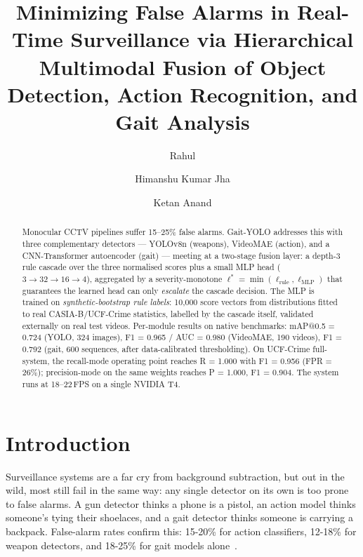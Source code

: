 \documentclass[runningheads]{llncs}
\begin{document}
\title{Minimizing False Alarms in Real-Time Surveillance via Hierarchical Multimodal Fusion of Object Detection, Action Recognition, and Gait Analysis}


\author{
Rahul \and
Himanshu Kumar Jha \and
Ketan Anand 
}



\maketitle

\begin{abstract}
Monocular CCTV pipelines suffer 15--25\% false alarms. Gait-YOLO addresses this with three complementary detectors --- YOLOv8n (weapons), VideoMAE (action), and a CNN-Transformer autoencoder (gait) --- meeting at a two-stage fusion layer: a depth-3 rule cascade over the three normalised scores plus a small MLP head ($3{\to}32{\to}16{\to}4$), aggregated by a severity-monotone $\ell^*=\min(\ell_\text{rule},\ell_\text{MLP})$ that guarantees the learned head can only \emph{escalate} the cascade decision. The MLP is trained on \emph{synthetic-bootstrap rule labels}: 10{,}000 score vectors from distributions fitted to real CASIA-B/UCF-Crime statistics, labelled by the cascade itself, validated externally on real test videos. Per-module results on native benchmarks: mAP@0.5 = 0.724 (YOLO, 324 images), F1 = 0.965 / AUC = 0.980 (VideoMAE, 190 videos), F1 = 0.792 (gait, 600 sequences, after data-calibrated thresholding). On UCF-Crime full-system, the recall-mode operating point reaches R = 1.000 with F1 = 0.956 (FPR = 26\%); precision-mode on the same weights reaches P = 1.000, F1 = 0.904. The system runs at 18--22\,FPS on a single NVIDIA T4.

\end{abstract}

\section{Introduction}

Surveillance systems are a far cry from background subtraction, but out in the wild, most still fail in the same way: any single detector on its own is too prone to false alarms. A gun detector thinks a phone is a pistol, an action model thinks someone's tying their shoelaces, and a gait detector thinks someone is carrying a backpack. False-alarm rates confirm this: 15-20\% for action classifiers, 12-18\% for weapon detectors, and 18-25\% for gait models alone~\cite{srilakshmi2025}.
\end{document}
